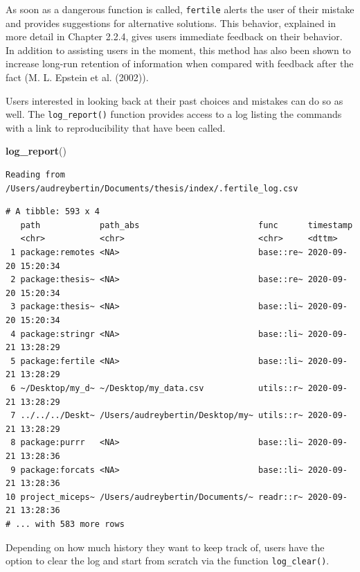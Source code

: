 \documentclass[12pt,twoside]{reedthesis}
\newenvironment{Shaded}{\begin{snugshade}}{\end{snugshade}}
\newcommand{\KeywordTok}[1]{\textcolor[rgb]{0.13,0.29,0.53}{\textbf{#1}}}
\newcommand{\NormalTok}[1]{#1}
\begin{document}
As soon as a dangerous function is called, \texttt{fertile} alerts the
user of their mistake and provides suggestions for alternative
solutions. This behavior, explained in more detail in Chapter 2.2.4,
gives users immediate feedback on their behavior. In addition to
assisting users in the moment, this method has also been shown to
increase long-run retention of information when compared with feedback
after the fact (M. L. Epstein et al. (2002)).

Users interested in looking back at their past choices and mistakes can
do so as well. The \texttt{log\_report()} function provides access to a
log listing the commands with a link to reproducibility that have been
called.
\begin{Shaded}
\begin{Highlighting}[]
\KeywordTok{log_report}\NormalTok{()}
\end{Highlighting}
\end{Shaded}
\begin{verbatim}
Reading from /Users/audreybertin/Documents/thesis/index/.fertile_log.csv
\end{verbatim}
\begin{verbatim}
# A tibble: 593 x 4
   path            path_abs                        func      timestamp          
   <chr>           <chr>                           <chr>     <dttm>             
 1 package:remotes <NA>                            base::re~ 2020-09-20 15:20:34
 2 package:thesis~ <NA>                            base::re~ 2020-09-20 15:20:34
 3 package:thesis~ <NA>                            base::li~ 2020-09-20 15:20:34
 4 package:stringr <NA>                            base::li~ 2020-09-21 13:28:29
 5 package:fertile <NA>                            base::li~ 2020-09-21 13:28:29
 6 ~/Desktop/my_d~ ~/Desktop/my_data.csv           utils::r~ 2020-09-21 13:28:29
 7 ../../../Deskt~ /Users/audreybertin/Desktop/my~ utils::r~ 2020-09-21 13:28:29
 8 package:purrr   <NA>                            base::li~ 2020-09-21 13:28:36
 9 package:forcats <NA>                            base::li~ 2020-09-21 13:28:36
10 project_miceps~ /Users/audreybertin/Documents/~ readr::r~ 2020-09-21 13:28:36
# ... with 583 more rows
\end{verbatim}
Depending on how much history they want to keep track of, users have the
option to clear the log and start from scratch via the function
\texttt{log\_clear()}.
\end{document}
